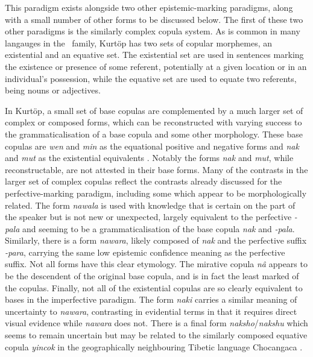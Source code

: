 This paradigm exists alongside two other epistemic-marking paradigms, along with a small number of other forms to be discussed below. The first of these two other paradigms is the similarly complex copula system. As is common in many langauges in the \lfam\ family, Kurtöp has two sets of copular morphemes, an existential and an equative set. The existential set are used in sentences marking the existence or presence of some referent, potentially at a given location or in an individual's possession, while the equative set are used to equate two referents, being nouns or adjectives.

In Kurtöp, a small set of base copulas are complemented by a much larger set of complex or composed forms, which can be reconstructed with varying success to the grammaticalisation of a base copula and some other morphology. These base copulas are \textit{wen} and \textit{min} as the equational positive and negative forms and \textit{nak} and \textit{mut} as the existential equivalents \cite[120]{Hyslop2014}. Notably the forms \textit{nak} and \textit{mut}, while reconstructable, are not attested in their base forms. Many of the contrasts in the larger set of complex copulas reflect the contrasts already discussed for the perfective-marking paradigm, including some which appear to be morphologically related. The form \textit{nawala} is used with knowledge that is certain on the part of the speaker but is not new or unexpected, largely equivalent to the perfective \textit{-pala} and seeming to be a grammaticalisation of the base copula \textit{nak} and \textit{-pala}. Similarly, there is a form \textit{nawara}, likely composed of \textit{nak} and the perfective suffix \textit{-para}, carrying the same low epistemic confidence meaning as the perfective suffix. Not all forms have this clear etymology. The mirative copula \textit{nâ} appears to be the descendent of the original base copula, and is in fact the least marked of the copulas. Finally, not all of the existential copulas are so clearly equivalent to bases in the imperfective paradigm. The form \textit{naki} carries a similar meaning of uncertainty to \textit{nawara}, contrasting in evidential terms in that it requires direct visual evidence while \textit{nawara} does not. There is a final form \textit{naksho}/\textit{nakshu} which seems to remain uncertain \cites[122]{Hyslop2014}[311]{Hyslop2017} but may be related to the similarly composed equative copula \textit{yincok} in the geographically neighbouring Tibetic language Chocangaca \cite{Bodnaruk2023a}.

